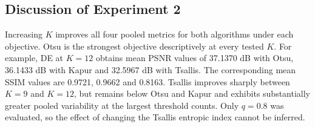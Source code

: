 \documentclass[review]{elsarticle}
\begin{document}
\begin{table}[htbp]
\centering
\small
\caption{Class separability on CHAOS: pooled mean $\pm$ sample standard deviation across 450 observations per entry.}
\label{tab:chaos-class-separability}
\end{table}

\subsection{Discussion of Experiment 2}

Increasing $K$ improves all four pooled metrics for both algorithms under
each objective. Otsu is the strongest objective descriptively at every
tested $K$. For example, DE at $K=12$ obtains mean PSNR values of
37.1370 dB with Otsu, 36.1433 dB with Kapur and 32.5967 dB with Tsallis.
The corresponding mean SSIM values are 0.9721, 0.9662 and 0.8163.
Tsallis improves sharply between $K=9$ and $K=12$, but remains below Otsu
and Kapur and exhibits substantially greater pooled variability at the
largest threshold counts. Only $q=0.8$ was evaluated, so the effect of
changing the Tsallis entropic index cannot be inferred.
\end{document}
